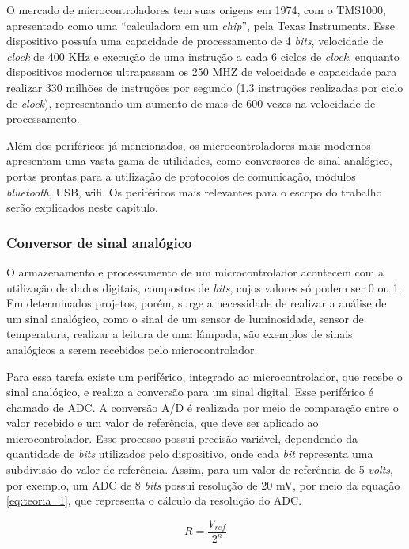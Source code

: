 O mercado de microcontroladores tem suas origens em 1974, com o TMS1000, apresentado como uma “calculadora em um \textit{chip}”, pela Texas Instruments. Esse dispositivo possuía uma capacidade de processamento de 4 \textit{bits}, velocidade de \textit{clock} de 400 KHz e execução de uma instrução a cada 6 ciclos de \textit{clock}, enquanto dispositivos modernos ultrapassam os 250 MHZ de velocidade e capacidade para realizar 330 milhões de instruções por segundo (1.3 instruções realizadas por ciclo de \textit{clock}), representando um aumento de mais de 600 vezes na velocidade de processamento.

Além dos periféricos já mencionados, os microcontroladores mais modernos apresentam uma vasta gama de utilidades, como conversores de sinal analógico, portas prontas para a utilização de protocolos de comunicação, módulos \textit{bluetooth}, \ac{USB}, wifi. Os periféricos mais relevantes para o escopo do trabalho serão explicados neste capítulo.

\subsubsection{Conversor de sinal analógico}

O armazenamento e processamento de um microcontrolador acontecem com a utilização de dados digitais, compostos de \textit{bits}, cujos valores só podem ser 0 ou 1. Em determinados projetos, porém, surge a necessidade de realizar a análise de um sinal analógico, como o sinal de um sensor de luminosidade, sensor de temperatura, realizar a leitura de uma lâmpada, são exemplos de sinais analógicos a serem recebidos pelo microcontrolador.

Para essa tarefa existe um periférico, integrado ao microcontrolador, que recebe o sinal analógico, e realiza a conversão para um sinal digital. Esse periférico é chamado de \ac{ADC}. A conversão A/D é realizada por meio de comparação entre o valor recebido e um valor de referência, que deve ser aplicado ao microcontrolador. Esse processo possui precisão variável, dependendo da quantidade de \textit{bits} utilizados pelo dispositivo, onde cada \textit{bit} representa uma subdivisão do valor de referência. Assim, para um valor de referência de 5 \textit{volts}, por exemplo, um \ac{ADC} de 8 \textit{bits} possui resolução de 20 mV, por meio da equação \ref{eq:teoria_1}, que representa o cálculo da resolução do \ac{ADC}.

\begin{equation}
\label{eq:teoria_1}
R = \frac{V_{ref}}{2^n}
\end{equation}

